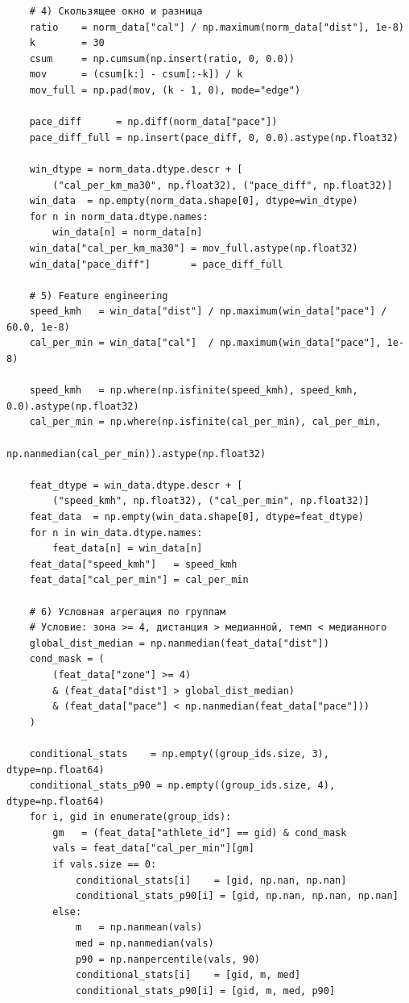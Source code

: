 \documentclass[oneside,a4paper,14pt]{extarticle}
\begin{document}
\newpage
\small
\begin{verbatim}
    # 4) Скользящее окно и разница
    ratio    = norm_data["cal"] / np.maximum(norm_data["dist"], 1e-8)
    k        = 30
    csum     = np.cumsum(np.insert(ratio, 0, 0.0))
    mov      = (csum[k:] - csum[:-k]) / k
    mov_full = np.pad(mov, (k - 1, 0), mode="edge")

    pace_diff      = np.diff(norm_data["pace"])
    pace_diff_full = np.insert(pace_diff, 0, 0.0).astype(np.float32)

    win_dtype = norm_data.dtype.descr + [
        ("cal_per_km_ma30", np.float32), ("pace_diff", np.float32)]
    win_data  = np.empty(norm_data.shape[0], dtype=win_dtype)
    for n in norm_data.dtype.names:
        win_data[n] = norm_data[n]
    win_data["cal_per_km_ma30"] = mov_full.astype(np.float32)
    win_data["pace_diff"]       = pace_diff_full

    # 5) Feature engineering
    speed_kmh   = win_data["dist"] / np.maximum(win_data["pace"] / 60.0, 1e-8)
    cal_per_min = win_data["cal"]  / np.maximum(win_data["pace"], 1e-8)

    speed_kmh   = np.where(np.isfinite(speed_kmh), speed_kmh, 0.0).astype(np.float32)
    cal_per_min = np.where(np.isfinite(cal_per_min), cal_per_min,
                           np.nanmedian(cal_per_min)).astype(np.float32)

    feat_dtype = win_data.dtype.descr + [
        ("speed_kmh", np.float32), ("cal_per_min", np.float32)]
    feat_data  = np.empty(win_data.shape[0], dtype=feat_dtype)
    for n in win_data.dtype.names:
        feat_data[n] = win_data[n]
    feat_data["speed_kmh"]   = speed_kmh
    feat_data["cal_per_min"] = cal_per_min

    # 6) Условная агрегация по группам
    # Условие: зона >= 4, дистанция > медианной, темп < медианного
    global_dist_median = np.nanmedian(feat_data["dist"])
    cond_mask = (
        (feat_data["zone"] >= 4)
        & (feat_data["dist"] > global_dist_median)
        & (feat_data["pace"] < np.nanmedian(feat_data["pace"]))
    )

    conditional_stats    = np.empty((group_ids.size, 3), dtype=np.float64)
    conditional_stats_p90 = np.empty((group_ids.size, 4), dtype=np.float64)
    for i, gid in enumerate(group_ids):
        gm   = (feat_data["athlete_id"] == gid) & cond_mask
        vals = feat_data["cal_per_min"][gm]
        if vals.size == 0:
            conditional_stats[i]    = [gid, np.nan, np.nan]
            conditional_stats_p90[i] = [gid, np.nan, np.nan, np.nan]
        else:
            m   = np.nanmean(vals)
            med = np.nanmedian(vals)
            p90 = np.nanpercentile(vals, 90)
            conditional_stats[i]    = [gid, m, med]
            conditional_stats_p90[i] = [gid, m, med, p90]


\end{verbatim}
\end{document}
